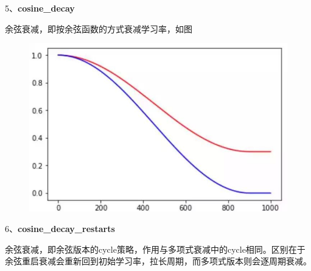 5、\textbf{cosine\_decay}

\begin{Shaded}
\begin{Highlighting}[]
\OperatorTok{=}\NormalTok{,}
\OperatorTok{=}\NormalTok{)}
\end{Highlighting}
\end{Shaded}

余弦衰减，即按余弦函数的方式衰减学习率，如图

\begin{figure}
\centering
\includegraphics{./img/ch14/余弦衰减.jpeg}
\caption{}
\end{figure}

6、\textbf{cosine\_decay\_restarts}

\begin{Shaded}
\begin{Highlighting}[]
\OperatorTok{=}\OperatorTok{=}\OperatorTok{=}\OperatorTok{=}\NormalTok{)}
\end{Highlighting}
\end{Shaded}

余弦衰减，即余弦版本的cycle策略，作用与多项式衰减中的cycle相同。区别在于余弦重启衰减会重新回到初始学习率，拉长周期，而多项式版本则会逐周期衰减。

